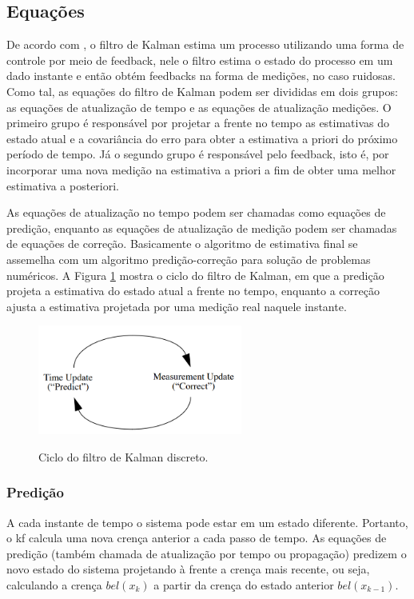 \documentclass[acronym, symbols, table]{fei}
\begin{document}
		\subsection{Equações}
			
			De acordo com \textcite{khodarahmi2023review}, o filtro de Kalman estima um processo utilizando uma forma de controle por meio de feedback, nele o filtro estima o estado do processo em um dado instante e então obtém feedbacks na forma de medições, no caso ruidosas. Como tal, as equações do filtro de Kalman podem ser divididas em dois grupos: as equações de atualização de tempo e as equações de atualização medições. O primeiro grupo é responsável por projetar a frente no tempo as estimativas do estado atual e a covariância do erro para obter a estimativa a priori do próximo período de tempo. Já o segundo grupo é responsável pelo feedback, isto é, por incorporar uma nova medição na estimativa a priori a fim de obter uma melhor estimativa a posteriori.
			
			As equações de atualização no tempo podem ser chamadas como equações de predição, enquanto as equações de atualização de medição podem ser chamadas de equações de correção. Basicamente o algoritmo de estimativa final se assemelha com um algoritmo predição-correção para solução de problemas numéricos. A Figura \ref{fig:predicao_atualizacao_kalman} mostra o ciclo do filtro de Kalman, em que a predição projeta a estimativa do estado atual a frente no tempo, enquanto a correção ajusta a estimativa projetada por uma medição real naquele instante.
			
			\begin{figure}[!htb]
				\centering
				\caption{Ciclo do filtro de Kalman discreto.} 
				\includegraphics[width=0.6\textwidth]{predicao_atualizacao_kalman.png}
				\label{fig:predicao_atualizacao_kalman}
			\end{figure}
			
			\subsubsection{Predição}
				A cada instante de tempo o sistema pode estar em um estado diferente. Portanto, o \acrshort{kf} calcula uma nova crença anterior a cada passo de tempo. As equações de predição (também chamada de atualização por tempo ou propagação) predizem o novo estado do sistema projetando à frente a crença mais recente, ou seja, calculando a crença $bel(x_k)$ a partir da crença do estado anterior $bel(x_{k-1})$. 
				
\end{document}
